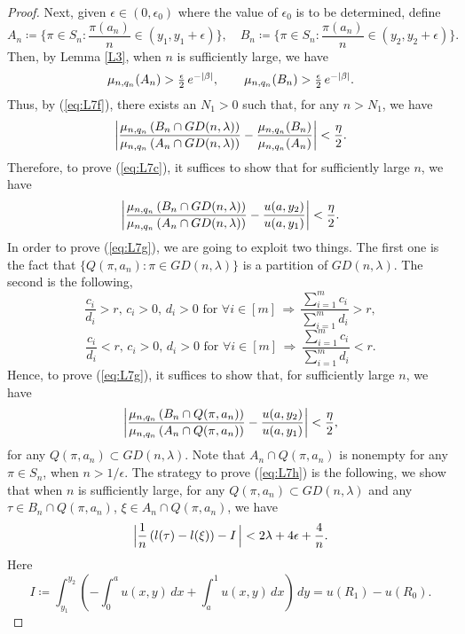 \begin{proof}
Next, given $\epsilon \in (0,  \epsilon_0)$ where the value of $\epsilon_0$ is to be determined, define
\[
\textstyle A_n \coloneqq \{ \pi \in S_n :  \frac{\pi(a_n)}{n} \in (y_1, y_1 + \epsilon) \},
\quad
B_n \coloneqq \{ \pi \in S_n :  \frac{\pi(a_n)}{n} \in (y_2, y_2 + \epsilon) \}.
\]
Then, by Lemma \ref{L3}, when $n$ is sufficiently large, we have
\[
\textstyle\mu_{n, q_n} (A_n) > \frac{\epsilon}{2}\,e^{-|\beta|}, \qquad \mu_{n, q_n} (B_n) > \frac{\epsilon}{2} \, e^{-|\beta|}.
\]
Thus, by (\ref{eq:L7f}), there exists an $N_1 > 0$ such that, for any $n > N_1$, we have
\[
 \left| \frac{\mu_{n, q_n} \left(B_n \cap GD(n, \lambda) \right)}{\mu_{n, q_n} \left(A_n \cap GD(n, \lambda) \right)}
  - \frac{\mu_{n, q_n} (B_n)}{\mu_{n, q_n} (A_n)} \right| < \frac{\eta}{2}.
\]
Therefore, to prove (\ref{eq:L7c}), it suffices to show that for sufficiently large $n$, we have
\begin{equation}
\left| \frac{\mu_{n, q_n} \left(B_n \cap GD(n, \lambda) \right)}{\mu_{n, q_n} \left(A_n \cap GD(n, \lambda) \right)}
- \frac{u(a, y_2)}{u(a, y_1)} \right| < \frac{\eta}{2}.  \label{eq:L7g}
\end{equation}
In order to prove (\ref{eq:L7g}), we are going to exploit two things. The first one is the fact that $\{ Q(\pi, a_n) : \pi \in GD(n, \lambda) \}$ is a partition of $GD(n, \lambda)$. The second is the following,
\[
\frac{c_i}{d_i} > r,\, c_i>0,\, d_i>0 \text{ for } \forall i \in [m]\, \Rightarrow\, \frac{\sum_{i=1}^{m}c_i}{\sum_{i=1}^{m}d_i} > r,
\]
\[
\frac{c_i}{d_i} < r,\, c_i>0,\, d_i>0 \text{ for } \forall i \in [m]\, \Rightarrow\, \frac{\sum_{i=1}^{m}c_i}{\sum_{i=1}^{m}d_i} < r.
\]
Hence, to prove (\ref{eq:L7g}), it suffices to show that, for sufficiently large $n$, we have
\begin{equation}
\left| \frac{\mu_{n, q_n} \left(B_n \cap Q(\pi, a_n) \right)}{\mu_{n, q_n} \left(A_n \cap Q(\pi, a_n) \right)}
- \frac{u(a, y_2)}{u(a, y_1)} \right| < \frac{\eta}{2} ,  \label{eq:L7h}
\end{equation}
for any $Q(\pi, a_n) \subset GD(n, \lambda)$. Note that $A_n \cap Q(\pi, a_n)$ is nonempty for any $\pi \in S_n$, when $n > 1/\epsilon$.
The strategy to prove (\ref{eq:L7h}) is the following, we show that when $n$ is sufficiently large, for any $Q(\pi, a_n) \subset GD(n, \lambda)$ and any $\tau \in B_n \cap Q(\pi, a_n)$, $\xi \in A_n \cap Q(\pi, a_n)$, we have
\begin{equation}
\Big| \frac{1}{n}\left( l(\tau) - l(\xi) \right) - I\,\Big| < 2 \lambda + 4 \epsilon + \frac{4}{n}. \label{eq:L7k}
\end{equation}
Here 
\[
I \coloneqq \int_{y_1}^{y_2} \left(-\int_{0}^{a} u(x, y) \, dx + \int_{a}^{1}u(x, y) \, dx \right) \, dy = u(R_1) - u(R_0).
\]
\end{proof}
